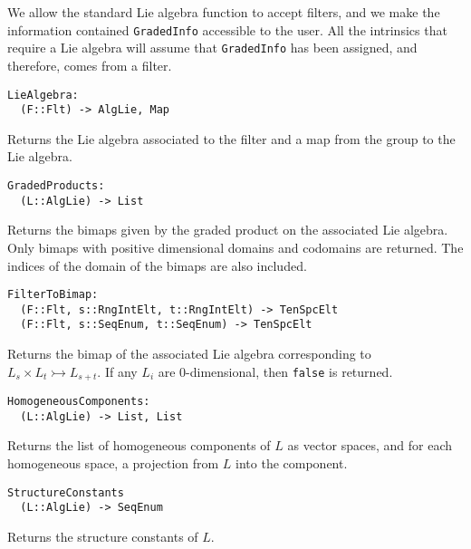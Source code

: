 \documentclass{amsart}
\begin{document}
We allow the standard Lie algebra function to accept filters, and we make the information contained {\tt GradedInfo} accessible to the user.
All the intrinsics that require a Lie algebra will assume that {\tt GradedInfo} has been assigned, and therefore, comes from a filter.

\color{blue}
\begin{verbatim}
LieAlgebra:
  (F::Flt) -> AlgLie, Map
\end{verbatim}
\color{black}

Returns the Lie algebra associated to the filter and a map from the group to the Lie algebra. 

\color{blue}
\begin{verbatim}
GradedProducts:
  (L::AlgLie) -> List
\end{verbatim}
\color{black}

Returns the bimaps given by the graded product on the associated Lie algebra. 
Only bimaps with positive dimensional domains and codomains are returned.
The indices of the domain of the bimaps are also included.

\color{blue}
\begin{verbatim}
FilterToBimap:
  (F::Flt, s::RngIntElt, t::RngIntElt) -> TenSpcElt
  (F::Flt, s::SeqEnum, t::SeqEnum) -> TenSpcElt
\end{verbatim}
\color{black}

Returns the bimap of the associated Lie algebra corresponding to $L_s\times L_t\rightarrowtail L_{s+t}$.
If any $L_i$ are 0-dimensional, then {\tt false} is returned.

\color{blue}
\begin{verbatim}
HomogeneousComponents:
  (L::AlgLie) -> List, List
\end{verbatim}
\color{black}

Returns the list of homogeneous components of $L$ as vector spaces, and for each homogeneous space, a projection from $L$ into the component.

\color{blue}
\begin{verbatim}
StructureConstants
  (L::AlgLie) -> SeqEnum
\end{verbatim}
\color{black}

Returns the structure constants of $L$.
\end{document}
